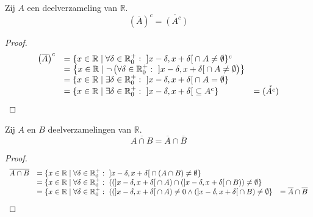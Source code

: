 \documentclass[main.tex]{subfiles}
\begin{document}
\begin{st}
  Zij $A$ een deelverzameling van $\mathbb{R}$.
  \[ \left(\overline{A}\right)^{c} = \mathring{\left(A^{c}\right)} \]

  \begin{proof}
    \[
    \begin{array}{rll}
      \left(\overline{A}\right)^{c}
      &= \{ x\in \mathbb{R} \mid \forall \delta \in \mathbb{R}_{0}^{+}:\ \interval[open]{x-\delta}{ x+\delta} \cap A \neq \emptyset \}^{c}\\
      &= \left\{ x\in \mathbb{R} \mid \neg\left(\forall \delta \in \mathbb{R}_{0}^{+}:\ \interval[open]{x-\delta}{ x+\delta} \cap A \neq \emptyset \right) \right\}\\
      &= \{ x\in \mathbb{R} \mid \exists \delta \in \mathbb{R}_{0}^{+}:\ \interval[open]{x-\delta}{ x+\delta} \cap A = \emptyset \}\\
      &= \{ x\in \mathbb{R} \mid \exists \delta \in \mathbb{R}_{0}^{+}:\ \interval[open]{x-\delta}{ x+\delta} \subseteq A^{c} \}
      &= \mathring{\left(A^{c}\right)}\\
    \end{array}
    \]
  \end{proof}
\feed
{}
\end{st}

\begin{st}
  Zij $A$ en $B$ deelverzamelingen van $\mathbb{R}$.
  \[ \overline{A \cap B} = \overline{A} \cap \overline{B} \]

  \begin{proof}
    \[
    \begin{array}{rll}
      \overline{A \cap B} 
      &= \{ x\in \mathbb{R} \mid \forall \delta \in \mathbb{R}_{0}^{+}:\ \interval[open]{x-\delta}{ x+\delta} \cap (A \cap B) \neq \emptyset \}\\
      &= \{ x\in \mathbb{R} \mid \forall \delta \in \mathbb{R}_{0}^{+}:\ ((\interval[open]{x-\delta}{ x+\delta} \cap A) \cap (\interval[open]{x-\delta}{ x+\delta} \cap B)) \neq \emptyset \}\\
      &= \{ x\in \mathbb{R} \mid \forall \delta \in \mathbb{R}_{0}^{+}:\ ((\interval[open]{x-\delta}{ x+\delta} \cap A) \neq 0 \wedge (\interval[open]{x-\delta}{ x+\delta} \cap B) \neq \emptyset \}
      &= \overline{A} \cap \overline{B} \\
    \end{array}
    \]
  \end{proof}
\feed
{}
\end{st}
\end{document}
